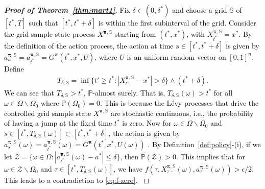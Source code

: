 \documentclass[11pt]{article}
\newcommand{\1}{\mathbbm{1}}
\newcommand{\bpi}{\boldsymbol{\pi}}
\newcommand{\rev}[1]{\textcolor{black}{{#1}}} %
\begin{document}
\begin{proof}[\bf Proof of Theorem~\ref{thm:mart1}]
\rev{
Fix $\delta \in (0, \delta^*)$ and choose a grid $\mathbb{S}$ of $[t^*, T]$ such that $[t^*, t^* + \delta]$ is within the first subinterval of the grid.
Consider the grid sample state process $X^{\boldsymbol{\pi}, \mathbb{S}}$ starting from $(t^*, x^*)$, with $X^{\boldsymbol{\pi}, \mathbb{S}}_{t^*} = x^*$. By the definition of the action process, the action at time $s \in [t^*, t^* + \delta]$ is given by $a_{s}^{\bpi, \mathbb{S}} = a_{t^*}^{\bpi, \mathbb{S}} = G^{\bpi}(t^*, x^*, U) $, where $U$ is an uniform random vector on $[0,1]^n$.
Define
\begin{align}
	T_{\delta, \mathbb{S}} = \inf \{t' \ge t^*:  |X_{t'}^{\boldsymbol{\pi}, \mathbb{S}} - x^*| > \delta\}  \wedge (t^* + \delta).
\end{align}
We can see that $T_{\delta, \mathbb{S}} > t^*$, $\mathbb{P}$-almost surely. That is, $T_{\delta, \mathbb{S}}(\omega) > t^*$ for all $\omega \in \Omega \backslash \Omega_0$ where $\mathbb{P}(\Omega_0)=0.$
This is because the L\'evy processes that drive the controlled grid sample state $X^{\bpi, \mathbb{S}}$
are stochastic continuous, i.e., the probability of having a jump at the fixed time $t^*$ is zero.
Now for $\omega \in \Omega \backslash \Omega_0$ and $s \in [t^*, T_{\delta, \mathbb{S}}(\omega)] \subset [t^*, t^* + \delta]$, the action is given by
$a_{s}^{\bpi, \mathbb{S}}(\omega)  = a_{t^*}^{\bpi, \mathbb{S}}(\omega) = G^{\bpi}(t^*, x^*, U(\omega))$ .
By Definition~\ref{def:policy}-(i), if we let $\mathcal{Z} = \{\omega \in \Omega: |a_{t^*}^{\bpi, \mathbb{S}}(\omega) - a^*| \le \delta \}$, then $\mathbb{P}(\mathcal{Z}) >0$.
This implies that for $\omega \in \mathcal{Z} \backslash \Omega_0$ and $\tau \in [t^*, T_{\delta, \mathbb{S}}(\omega)]$, we have $f(\tau,  X_{\tau-}^{\boldsymbol{\pi}, \mathbb{S}}(\omega), a_\tau^{\boldsymbol{\pi}, \mathbb{S}} (\omega)) > \epsilon/2$. %
 This leads to a contradiction to \eqref{eq:f-zero}. }

\end{proof}
\end{document}
